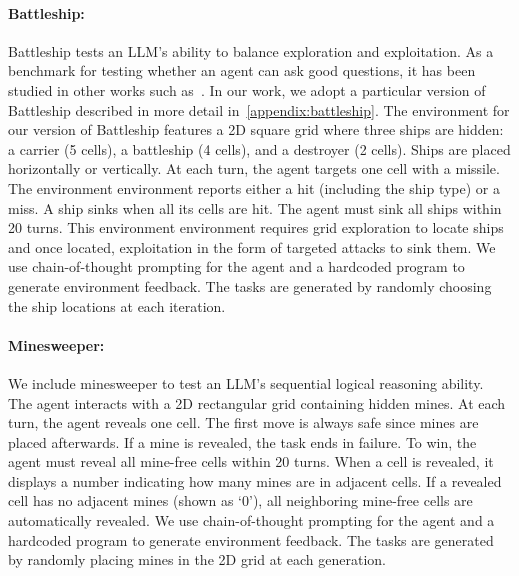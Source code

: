 \paragraph{Battleship: } Battleship tests an LLM's ability to balance exploration and exploitation. As a benchmark for testing whether an agent can ask good questions, it has been studied in other works such as~\citet{grand2024a,grand2025shootfirstaskquestions,rothe2016battleship,rothe2017questionaskingprogramgeneration,Rothe2018,Rothe2019}. In our work, we adopt a particular version of Battleship described in more detail in~\cref{appendix:battleship}.  The environment for our version of Battleship features a 2D square grid where three ships are hidden: a carrier (5 cells), a battleship (4 cells), and a destroyer (2 cells). Ships are placed horizontally or vertically.
At each turn, the agent targets one cell with a missile. The environment environment reports either a hit (including the ship type) or a miss. A ship sinks when all its cells are hit. The agent must sink all ships within 20 turns. This environment environment requires grid exploration to locate ships and once located, exploitation in the form of targeted attacks to sink them. We use chain-of-thought prompting for the agent and a hardcoded program to generate environment feedback. The tasks are generated by randomly choosing the ship locations at each iteration. 

\paragraph{Minesweeper: } We include minesweeper to test an LLM's sequential logical reasoning ability. The agent interacts with a 2D rectangular grid containing hidden mines. At each turn, the agent reveals one cell. The first move is always safe since mines are placed afterwards. If a mine is revealed, the task ends in failure. To win, the agent must reveal all mine-free cells within 20 turns. When a cell is revealed, it displays a number indicating how many mines are in adjacent cells. If a revealed cell has no adjacent mines (shown as `0'), all neighboring mine-free cells are automatically revealed. We use chain-of-thought prompting for the agent and a hardcoded program to generate environment feedback. The tasks are generated by randomly placing mines in the 2D grid at each generation.

